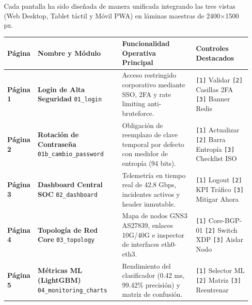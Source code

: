 \documentclass[11pt,a4paper]{article}
\begin{document}
Cada pantalla ha sido diseñada de manera unificada integrando las tres vistas (Web Desktop, Tablet táctil y Móvil PWA) en láminas maestras de 2400$\times$1500 px.

\begin{table}[h!]
\centering\small
\begin{tabularx}{\textwidth}{lp{4cm}Xp{3.2cm}}
\toprule
\textbf{Página} & \textbf{Nombre y Módulo} & \textbf{Funcionalidad Operativa Principal} & \textbf{Controles Destacados} \\
\midrule
\textbf{Página 1} & \textbf{Login de Alta Seguridad} \newline \texttt{01\_login} & Acceso restringido corporativo mediante SSO, 2FA y rate limiting anti-bruteforce. & \texttt{[1]} Validar \newline \texttt{[2]} Casillas 2FA \newline \texttt{[3]} Banner Redis \\
\midrule
\textbf{Página 2} & \textbf{Rotación de Contraseña} \newline \texttt{01b\_cambio\_password} & Obligación de reemplazo de clave temporal por defecto con medidor de entropía (94 bits). & \texttt{[1]} Actualizar \newline \texttt{[2]} Barra Entropía \newline \texttt{[3]} Checklist ISO \\
\midrule
\textbf{Página 3} & \textbf{Dashboard Central SOC} \newline \texttt{02\_dashboard} & Telemetría en tiempo real de 42.8 Gbps, incidentes activos y header inmutable. & \texttt{[1]} Logout \newline \texttt{[2]} KPI Tráfico \newline \texttt{[3]} Mitigar Ahora \\
\midrule
\textbf{Página 4} & \textbf{Topología de Red Core} \newline \texttt{03\_topology} & Mapa de nodos GNS3 AS27839, enlaces 10G/40G e inspector de interfaces eth0-eth3. & \texttt{[1]} Core-BGP-01 \newline \texttt{[2]} Switch XDP \newline \texttt{[3]} Aislar Nodo \\
\midrule
\textbf{Página 5} & \textbf{Métricas ML (LightGBM)} \newline \texttt{04\_monitoring\_charts} & Rendimiento del clasificador (0.42 ms, 99.42\% precisión) y matriz de confusión. & \texttt{[1]} Selector ML \newline \texttt{[2]} Matriz \newline \texttt{[3]} Reentrenar \\

\end{tabularx}
\end{table}
\end{document}
